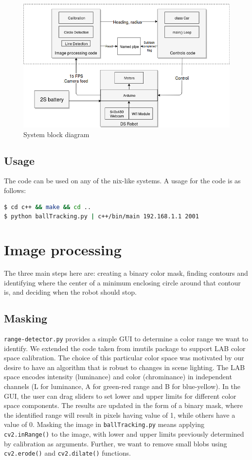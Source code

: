 \documentclass[12pt, twoside, a4paper, titlepage]{article}
\begin{document}
\begin{figure}[h]
\caption{System block diagram}\label{block}
\begin{center}
\includegraphics[width=0.9\columnwidth]{blockDiagram.png}
\end{center}
\end{figure}

\subsection{Usage}
The code can be used on any of the nix-like systems. A usage for the code is as follows:
\begin{lstlisting}[language=bash,caption={usage}]
$ cd c++ && make && cd ..
$ python ballTracking.py | c++/bin/main 192.168.1.1 2001
\end{lstlisting}

\section{Image processing}
The three main steps here are: creating a binary color mask, finding contours and identifying where the center of a minimum enclosing circle around that contour is, and deciding when the robot should stop. 

\subsection{Masking}
\texttt{range-detector.py} provides a simple GUI to determine a color range we want to identify. We extended the code taken from imutils package to support LAB color space calibration. The choice of this particular color space was motivated by our desire to have an algorithm that is robust to changes in scene lighting. The LAB space encodes intensity (luminance) and color (chrominance) in independent channels (L for luminance, A for green-red range and B for blue-yellow). In the GUI, the user can drag sliders to set lower and upper limits for different color space components. The results are updated in the form of a binary mask, where the identified range will result in pixels having value of 1, while others have a value of 0. 
\newline
Masking the image in \texttt{ballTracking.py} means applying \texttt{cv2.inRange()} to the image, with lower and upper limits previously determined by calibration as arguments. Further, we want to remove small blobs using \texttt{cv2.erode()} and \texttt{cv2.dilate()} functions. 
\end{document}
